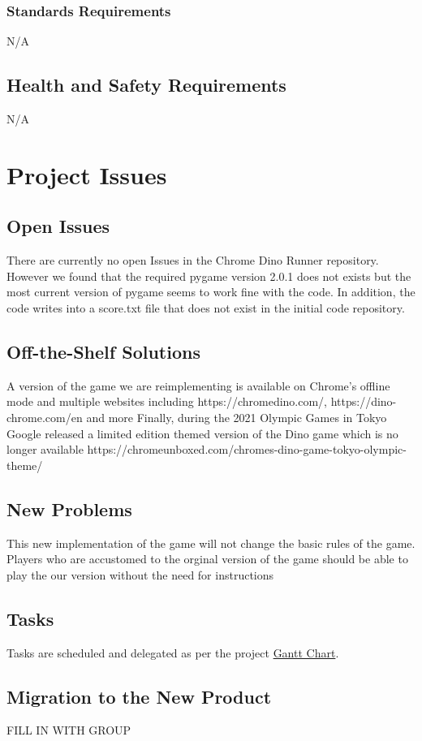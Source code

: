 \documentclass[12pt]{article}
\begin{document}
    \subsubsection{Standards Requirements} 
    N/A
\subsection{Health and Safety Requirements}
    N/A
\section{Project Issues}
\subsection{Open Issues}
There are currently no open Issues in the Chrome Dino Runner repository.
However we found that the required pygame version 2.0.1 does not exists but the most current version 
of pygame seems to work fine with the code.
In addition, the code writes into a score.txt file that does not exist in the initial code repository.
\subsection{Off-the-Shelf Solutions}
A version of the game we are reimplementing is available on Chrome's offline mode and multiple websites including
https://chromedino.com/, https://dino-chrome.com/en and more
Finally, during the 2021 Olympic Games in Tokyo Google released a limited edition themed version of the Dino game which is no longer available https://chromeunboxed.com/chromes-dino-game-tokyo-olympic-theme/
\subsection{New Problems}
This new implementation of the game will not change the basic rules of the game.
Players who are accustomed to the orginal version of the game should be able to play the our version without
the need for instructions
\subsection{Tasks}

Tasks are scheduled and delegated as per the project \href{}{\color{blue}Gantt Chart}.


\subsection{Migration to the New Product}
FILL IN WITH GROUP
\end{document}
